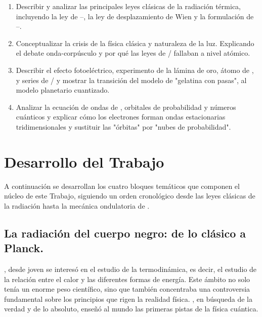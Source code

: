 \documentclass[11pt,a4paper,spanish]{book}
\begin{document}
\begin{enumerate}
  \item Describir y analizar las principales leyes clásicas de la
    radiación térmica, incluyendo la ley de
    \cite{stefan1879}--\cite{boltzmann1884},
    la ley de desplazamiento de Wien \cite{wien1893} y la formulación
    de \cite{rayleigh1900}--\cite{jeans1905}.

  \item Conceptualizar la crisis de la física clásica y naturaleza de
    la luz. Explicando el debate onda-corpúsculo y por qué las leyes
    de \cite{newton1704}/\cite{maxwell1865} fallaban a nivel atómico.

  \item Describir el efecto fotoeléctrico, experimento de la lámina
    de oro, átomo de \cite{bohr1913}, \cite{sommerfeld1916} y series
    de \cite{balmer1885}/\cite{lyman1906} y
    mostrar la transición del modelo de "gelatina con pasas", al
    modelo planetario cuantizado.

  \item Analizar la ecuación de ondas de \cite{schrodinger1926}, orbitales de
    probabilidad y números cuánticos y explicar cómo los electrones
    forman ondas estacionarias tridimensionales y sustituir las
    "órbitas" por "nubes de probabilidad".
\end{enumerate}

\chapter{Desarrollo del Trabajo}
A continuación se desarrollan los cuatro bloques temáticos que
componen el núcleo de este Trabajo, siguiendo un orden cronológico
desde las leyes clásicas de la radiación hasta la mecánica
ondulatoria de \cite{schrodinger1926}.
\section{La radiación del cuerpo negro: de lo clásico a Planck.}

\cite{planck1900}, desde joven se interesó en el estudio de la
termodinámica, es decir, el estudio de la relación entre el calor y
las diferentes formas de energía. Este ámbito no solo tenía un enorme
peso científico, sino que también concentraba una controversia
fundamental sobre los principios que rigen la realidad física.
\cite{planck1900}, en búsqueda de la verdad y de lo absoluto, enseñó
al mundo las primeras pistas de la física cuántica.
\end{document}
